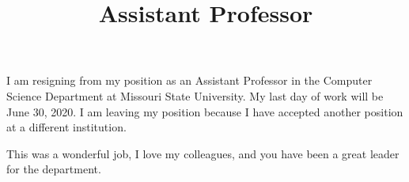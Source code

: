 \documentclass{coverletter}
\title{Assistant Professor}
\begin{document}
\begin{cl}



I am resigning from my position as an Assistant Professor in the Computer Science Department at Missouri State University. My last day of work will be June 30, 2020. I am leaving my position because I have accepted another position at a different institution.

This was a wonderful job, I love my colleagues, and you have been a great leader for the department.

\end{cl}
\end{document}
